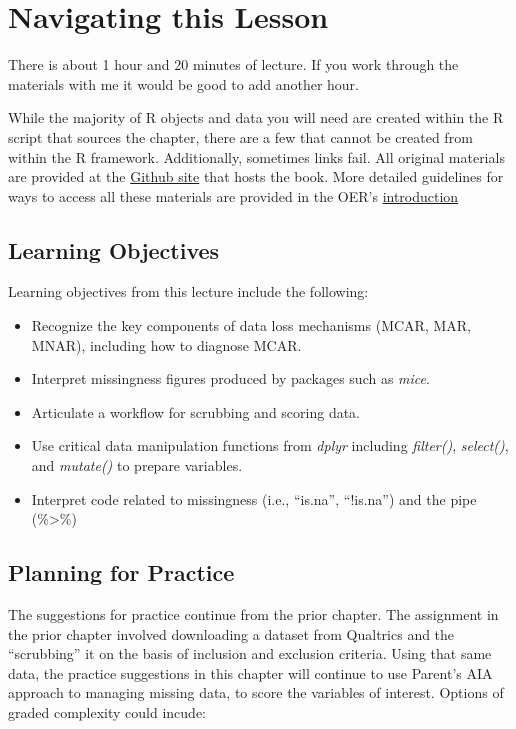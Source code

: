 \documentclass[
  11pt,
]{book}
\providecommand{\tightlist}{%
  \setlength{\itemsep}{0pt}\setlength{\parskip}{0pt}}
\begin{document}
\hypertarget{navigating-this-lesson-1}{%
\section{Navigating this Lesson}\label{navigating-this-lesson-1}}

There is about 1 hour and 20 minutes of lecture. If you work through the materials with me it would be good to add another hour.

While the majority of R objects and data you will need are created within the R script that sources the chapter, there are a few that cannot be created from within the R framework. Additionally, sometimes links fail. All original materials are provided at the \href{https://github.com/lhbikos/ReC_MultivModel}{Github site} that hosts the book. More detailed guidelines for ways to access all these materials are provided in the OER's \protect\hyperlink{ReCintro}{introduction}

\hypertarget{learning-objectives-1}{%
\subsection{Learning Objectives}\label{learning-objectives-1}}

Learning objectives from this lecture include the following:

\begin{itemize}
\tightlist
\item
  Recognize the key components of data loss mechanisms (MCAR, MAR, MNAR), including how to diagnose MCAR.
\item
  Interpret missingness figures produced by packages such as \emph{mice}.
\item
  Articulate a workflow for scrubbing and scoring data.
\item
  Use critical data manipulation functions from \emph{dplyr} including \emph{filter()}, \emph{select()}, and \emph{mutate()} to prepare variables.
\item
  Interpret code related to missingness (i.e., ``is.na'', ``!is.na'') and the pipe (\%\textgreater\%)
\end{itemize}

\hypertarget{planning-for-practice-1}{%
\subsection{Planning for Practice}\label{planning-for-practice-1}}

The suggestions for practice continue from the prior chapter. The assignment in the prior chapter involved downloading a dataset from Qualtrics and the ``scrubbing'' it on the basis of inclusion and exclusion criteria. Using that same data, the practice suggestions in this chapter will continue to use Parent's \citeyearpar{parent_handling_2013} AIA approach to managing missing data, to score the variables of interest. Options of graded complexity could incude:
\end{document}
